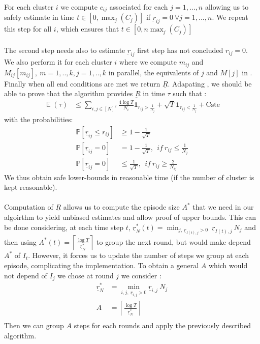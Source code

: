 \documentclass[11pt,a4paper]{article}
\DeclareMathOperator*{\expect}{\mathbb{E}}
\begin{document}
For each cluster $i$ we compute $c_{ij}$ associated for each $j=1,...,n$ allowing us to safely estimate in time $t \in \left[0,\max_j (C_j)\right]$ if $\underbar{r}_{ij}=0\ \forall j=1,...,n$. We repeat this step for all $i$, which ensures that $t \in \left[0,n \max_j\left(C_j\right)\right]$
\paragraph{}The second step needs also to estimate $\underbar{r}_{ij}$ first step has not concluded $r_{ij} = 0$. We also perform it for each cluster $i$ where we compute $m_{ij}$ and $M_{ij}[m_{ij}],\ m=1,..,k, j=1,..,k$ in parallel, the equivalents of $j$ and $M[j]$ in \cite{valko}.\\
Finally when all end conditions are met we return $\underline{R}$. Adapating \cite{valko}, we should be able to prove that the algorithm provides $\underbar{R}$ in time $\tau$ such that :
\begin{align*}
\expect\left({\tau}\right) &\leq \sum_{i,j \in [N]^2} \frac{4\log T}{N_i} \mathbf{1}_{r_{ij} > \frac{1}{N_j}} + \sqrt{T} \mathbf{1}_{r_{ij} < \frac{1}{N_j}}+ \mathrm{Cste}
\end{align*}
with the probabilities:
\begin{align*}
\mathbb{P} [\underline{r}_{ij} \leq r_{ij}]&\geq 1-\frac{1}{\sqrt{T}}\\
\mathbb{P} [\underline{r}_{ij}=0]&=1-\frac{1}{\sqrt{T}},\ \ if\ r_{ij}\leq \frac{1}{N_j}\\
\mathbb{P} [\underline{r}_{ij}=0]&\leq \frac{1}{\sqrt{T}},\ \ if\ r_{ij}\geq \frac{2}{N_{ij}}
\end{align*}
We thus obtain safe lower-bounds in reasonable time (if the number of cluster is kept reasonable).
\paragraph{}Computation of $\underline{R}$ allows us to compute the episode size $A^{*}$ that we need in our algoirthm to yield unbiased estimates and allow proof of upper bounds. This can be done considering, at each time step $t$, $\underline{r}_{N}^{*}(t)=\min_{j,\ \underline{r}_{I(t),j}>0}\ \underline{r}_{I(t),j}\:N_j$ and then using $A^{*}(t) =\left\lceil \frac{\log T}{\underline{r}_N^{*}} \right\rceil$ to group the next round, but would make depend $A^{*}$ of $I_t$. However, it forces us to update the number of steps we group at each episode, complicating the implementation. To obtain a general $A$ which would not depend of $I_j$ we chose at round $j$ we consider :
\begin{align*}
\underline{r}_N^* &= \min_{i,j,\ \underline{r}_{i,j}>0} \underline{r}_{i,j}\:N_j\\
A &= \left\lceil \frac{\log T}{\underline{r}_N^{*}} \right\rceil\\
\end{align*}
Then we can group $A$ steps for each rounds and apply the previously described algorithm.
\end{document}
